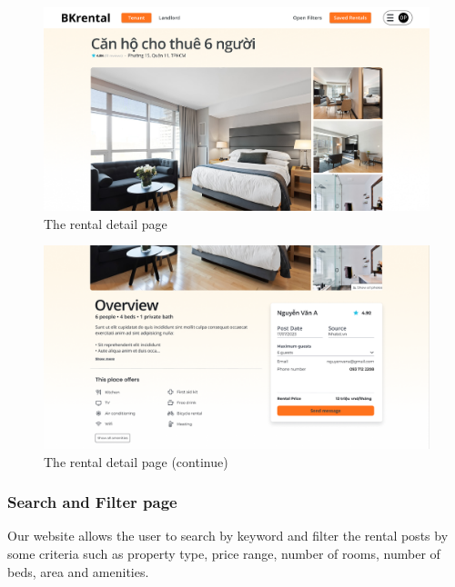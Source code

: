 \begin{figure}[ht]
    \centering
    \includegraphics[width=\textwidth]{Images/Mockup/rental_detail_1.png}
    \caption{The rental detail page}
    \label{fig:rental-detail-page}
\end{figure}

\begin{figure}[ht]
    \centering
    \includegraphics[width=\textwidth]{Images/Mockup/rental_detail_2.png}
    \caption{The rental detail page (continue)}
    \label{fig:rental-detail-page-2}
\end{figure}
\clearpage

\subsubsection{Search and Filter page}
Our website allows the user to search by keyword and filter the rental posts by some criteria such as property type, price range, number of rooms, number of beds, area and amenities. 

